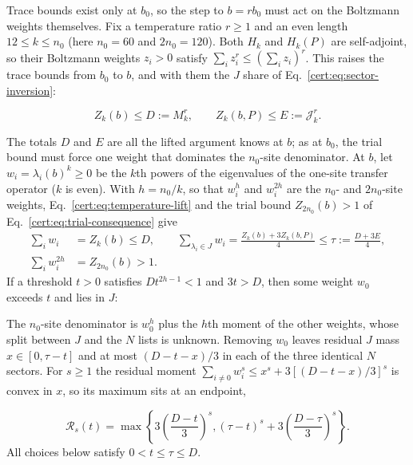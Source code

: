 Trace bounds exist only at $b_0$, so the step to $b=rb_0$ must act on
the Boltzmann weights themselves. Fix a temperature ratio $r\ge1$ and an even
length $12\le k\le n_0$ (here $n_0=60$ and $2n_0=120$). Both
$H_k$ and $H_k(P)$ are self-adjoint, so their Boltzmann weights $z_i>0$
satisfy $\sum_i z_i^r\le(\sum_i z_i)^r$. This raises the trace bounds
from $b_0$ to $b$, and with them the $J$ share of
Eq.~\eqref{cert:eq:sector-inversion}:
\begin{proofdiagram}
    \liftbars
\end{proofdiagram}
\begin{equation}
    Z_k(b)\le D:=M_k^r,\qquad
    Z_k(b,P)\le E:=\mathcal J_k^r.
    \label{cert:eq:temperature-lift}
\end{equation}

The totals $D$ and $E$ are all the lifted argument knows at $b$; as at
$b_0$, the trial bound must force one weight that dominates the
$n_0$-site denominator.
At $b$, let $w_i=\lambda_i(b)^k\ge0$ be the $k$th powers of the
eigenvalues of the one-site transfer operator ($k$ is even). With
$h=n_0/k$, so that $w_i^h$ and $w_i^{2h}$ are the $n_0$- and
$2n_0$-site weights, Eq.~\eqref{cert:eq:temperature-lift} and the
trial bound $Z_{2n_0}(b)>1$ of Eq.~\eqref{cert:eq:trial-consequence}
give
\begin{align}
    \sum_i w_i     &=Z_k(b)\le D,\qquad
    \sum_{\lambda_i\in J}w_i=\frac{Z_k(b)+3Z_k(b,P)}4\le\tau:=\frac{D+3E}4,
    \label{cert:eq:spatial-weights}\\
    \sum_iw_i^{2h} &=Z_{2n_0}(b)>1.
    \label{cert:eq:lifted-trial}
\end{align}
If a threshold $t>0$ satisfies $Dt^{2h-1}<1$ and $3t>D$, then some
weight $w_0$ exceeds $t$ and lies in $J$:
\begin{proofdiagram}
    \weightforcing
\end{proofdiagram}

The $n_0$-site denominator is $w_0^h$ plus the $h$th moment of the other
weights, whose split between $J$ and the $N$ lists is unknown.
Removing $w_0$ leaves residual $J$ mass $x\in[0,\tau-t]$ and at most
$(D-t-x)/3$ in each of the three identical $N$ sectors. For $s\ge1$ the
residual moment $\sum_{i\ne0}w_i^s\le x^s+3[(D-t-x)/3]^s$ is convex in
$x$, so its maximum sits at an endpoint,
\begin{proofdiagram}
    \residualends
\end{proofdiagram}
\begin{equation}
    \mathcal R_s(t)=
    \max\left\{3\left(\frac{D-t}{3}\right)^s,
    (\tau-t)^s+3\left(\frac{D-\tau}{3}\right)^s\right\}.
    \label{cert:eq:lifted-residual}
\end{equation}
All choices below satisfy $0<t\le\tau\le D$.

